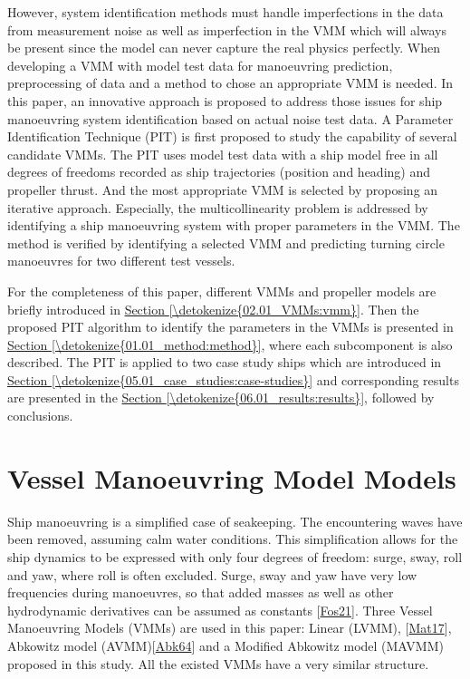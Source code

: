 \documentclass[review]{elsarticle}
\begin{document}
\sphinxAtStartPar
However, system identification methods must handle imperfections in the data from measurement noise as well as imperfection in the VMM which will always be present since the model can never capture the real physics perfectly. When developing a VMM with model test data for manoeuvring prediction, preprocessing of data and a method to chose an appropriate VMM is needed. In this paper, an innovative approach is proposed to address those issues for ship manoeuvring system identification based on actual noise test data. A Parameter Identification Technique (PIT) is first proposed to study the capability of several candidate VMMs. The PIT uses model test data with a ship model free in all degrees of freedoms recorded as ship trajectories (position and heading) and propeller thrust. And the most appropriate VMM is selected by proposing an iterative approach. Especially, the multicollinearity problem is addressed by identifying a ship manoeuvring system with proper parameters in the VMM.  The method is verified by identifying a selected VMM and predicting turning circle manoeuvres for two different test vessels.

\sphinxAtStartPar
For the completeness of this paper, different VMMs and propeller models are briefly introduced in \hyperref[\detokenize{02.01_VMMs:vmm}]{Section \ref{\detokenize{02.01_VMMs:vmm}}}. Then the proposed PIT algorithm to identify the parameters in the VMMs is presented in \hyperref[\detokenize{01.01_method:method}]{Section \ref{\detokenize{01.01_method:method}}}, where each subcomponent is also described. The PIT is applied to two case study ships which are introduced in \hyperref[\detokenize{05.01_case_studies:case-studies}]{Section \ref{\detokenize{05.01_case_studies:case-studies}}} and corresponding results are presented in the \hyperref[\detokenize{06.01_results:results}]{Section \ref{\detokenize{06.01_results:results}}}, followed by conclusions.


\section{Vessel Manoeuvring Model Models}
\label{\detokenize{02.01_VMMs:models}}\label{\detokenize{02.01_VMMs:vmm}}\label{\detokenize{02.01_VMMs::doc}}
\sphinxAtStartPar
Ship manoeuvring is a simplified case of seakeeping. The encountering waves have been removed, assuming calm water conditions. This simplification allows for the ship dynamics to be expressed with only four degrees of freedom: surge, sway, roll and yaw, where roll is often excluded. Surge, sway and yaw have very low frequencies during manoeuvres, so that added masses as well as other hydrodynamic derivatives can be assumed as constants {[}\hyperlink{cite.bibligraphy:id87}{Fos21}{]}. Three Vessel Manoeuvring Models (VMMs) are used in this paper: Linear (LVMM), {[}\hyperlink{cite.bibligraphy:id40}{Mat17}{]}, Abkowitz model (AVMM){[}\hyperlink{cite.bibligraphy:id25}{Abk64}{]} and a Modified Abkowitz model (MAVMM) proposed in this study. All the existed VMMs have a very similar structure.
\end{document}
